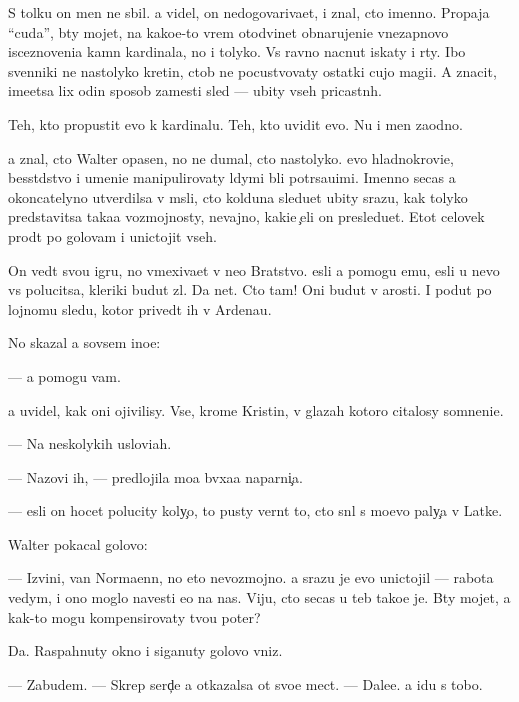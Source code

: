 \documentclass[10pt]{book}
\begin{document}
S tolku on men{\ia} ne sbil. {\Y}a videl, on nedogovariva{\y}et, i znal, cto imenno. Propaja ``cuda'', b{\yi}ty mojet, na kako{\y}e-to vrem{\ia} otodvinet obnarujeni{\y}e vnezapnovo iscez\-no\-ve\-ni\-{\y}a kamn{\ia} kardinala, no i tolyko. Vs{\e} ravno nacnut iskaty i r{\yi}ty. Ibo sv{\ia}{\x}enniki ne nastolyko kretin{\yi}, ctob{\yi} ne pocustvovaty ostatki cujo{\y} magi{\y}i. A znacit, ime\-{\y}et\-sa lix odin sposob zamesti sled{\yi} — ubity vseh pricastn{\yi}h.

Teh, kto propustit {\y}evo k kardinalu. Teh, kto uvidit {\y}evo. Nu i men{\ia} zaodno.

{\Y}a znal, cto Walter opasen, no ne dumal, cto nastolyko. {\Y}evo hladnokrovi{\y}e, besst{\yi}dstvo i umeni{\y}e manipulirovaty l{\io}dymi b{\yi}li potr{\ia}sa{\y}u{\x}imi. Imenno se{\y}cas {\y}a okoncatelyno utverdilsa v m{\yi}sli, cto kolduna sledu{\y}et ubity srazu, kak tolyko predstavitsa taka{\y}a vozmojnosty, ne\-vaj\-no, kaki{\y}e {\c}eli on presledu{\y}et. Etot celovek pro{\y}d{\e}t po golovam i unictojit vseh.

On ved{\e}t svo{\y}u igru, no vmexiva{\y}et v ne{\y}o Bratstvo. {\Y}esli {\y}a pomogu {\y}emu, {\y}esli u nevo vs{\e} polucitsa, kleriki budut zl{\yi}. Da net. Cto tam! Oni budut v {\y}arosti. I po{\y}dut po lojnomu sledu, kotor{\yi}{\y} prived{\e}t ih v Ardenau.

No skazal {\y}a sovsem ino{\y}e:

— {\Y}a pomogu vam.

{\Y}a uvidel, kak oni ojivilisy. Vse, krome Kristin{\yi}, v glazah kotoro{\y} citalosy somneni{\y}e.

— Na neskolykih uslovi{\y}ah.

— Nazovi ih, — predlojila mo{\y}a b{\yi}vxa{\y}a naparni{\c}a.

— {\Y}esli on hocet polucity koly{\c}o, to pusty vern{\e}t to, cto sn{\ia}l s mo{\y}evo paly{\c}a v Latke.

Walter pokacal go\-lo\-vo{\y}:

— Izvini, van Normaenn, no eto nevozmojno. {\Y}a srazu je {\y}evo unictojil — rabota vedym{\yi}, i ono moglo navesti {\y}e{\y}o na nas. Viju, cto se{\y}cas u teb{\ia} tako{\y}e je. B{\yi}ty mojet, {\y}a kak-to mogu kompensirovaty tvo{\y}u poter{\io}?

Da. Raspahnuty okno i siganuty go\-lo\-vo{\y} vniz.

— Zabudem. — Skrep{\ia} serd{\c}e {\y}a otkazalsa ot svo{\y}e{\y} mect{\yi}. — Dale{\y}e. {\Y}a idu s tobo{\y}.
\end{document}
